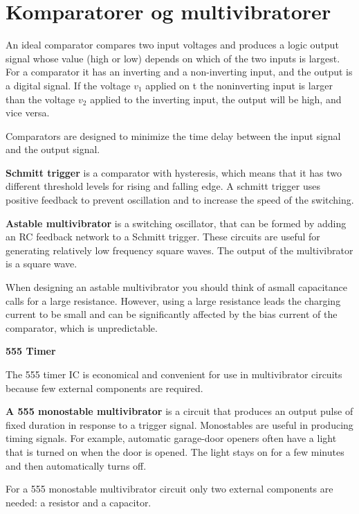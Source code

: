 \section{Komparatorer og multivibratorer}

An ideal comparator compares two input voltages and produces a logic output signal whose value (high or low) depends on which
of the two inputs is largest. For a comparator it has an inverting and a non-inverting input, and the output is a digital signal.
If the voltage $v_1$ applied on t the noninverting input is larger than the voltage $v_2$ applied to the inverting input, the output
will be high, and vice versa.

Comparators are designed to minimize the time delay between the input signal and the output signal.

\textbf{Schmitt trigger} is a comparator with hysteresis, which means that it has two different threshold levels for rising and falling edge.
A schmitt trigger uses positive feedback to prevent oscillation and to increase the speed of the switching.

\textbf{Astable multivibrator} is a switching oscillator, that can be formed by adding an RC feedback network to a Schmitt trigger.
These circuits are useful for generating relatively low frequency square waves. The output of the multivibrator is a square wave.

When designing an astable multivibrator you should think of  asmall capacitance calls for a large resistance. However, using a large resistance
leads the charging current to be small and can be significantly affected by the bias current of the comparator, which is unpredictable.

\textbf{555 Timer}

The 555 timer IC is economical and convenient for use in multivibrator circuits because few external components are required.



\textbf{A 555 monostable multivibrator} is a circuit that produces an output pulse of fixed duration in response to a trigger signal.
Monostables are useful in producing timing signals. For example, automatic garage-door openers often have a light that is turned on when the door is opened.
The light stays on for a few minutes and then automatically turns off.

For a 555 monostable multivibrator circuit only  two external components are needed: a resistor and a capacitor.

